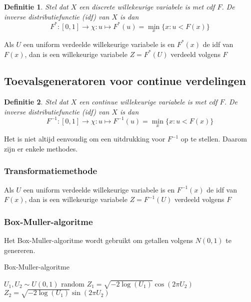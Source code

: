 \documentclass{article}
\newtheorem{mydef}{Definitie}
\begin{document}
	\begin{mydef}
		Stel dat $X$ een discrete willekeurige variabele is met cdf $F$. De inverse distributiefunctie (idf) van $X$ is dan
		$$
			F^*:[0,1] \rightarrow \chi : u \mapsto F^*(u) = \min_x\{x:u<F(x)\}
		$$
	\end{mydef}

	Als $U$ een uniform verdeelde willekeurige variabele is en $F^*(x)$ de idf van $F(x)$, dan is een willekeurige variabele $Z=F^*(U)$ verdeeld volgens $F$
	
	\subsection{Toevalsgeneratoren voor continue verdelingen}
	
	\begin{mydef}
		Stel dat $X$ een continue willekeurige variabele is met cdf $F$. De inverse distributiefunctie (idf) van $X$ is dan
		$$
		F^{-1}:[0,1] \rightarrow \chi : u \mapsto F^{-1}(u) = \min_x\{x:u<F(x)\}
		$$
	\end{mydef}

	Het is niet altijd eenvoudig om een uitdrukking voor $F^{-1}$ op te stellen. Daarom zijn er enkele methodes.
	
	\subsubsection{Transformatiemethode}
	
	Als $U$ een uniform verdeelde willekeurige variabele is en $F^{-1}(x)$ de idf van $F(x)$, dan is een willekeurige variabele $Z=F^{-1}(U)$ verdeeld volgens $F$
	
	\subsubsection{Box-Muller-algoritme}
	
	Het Box-Muller-algoritme wordt gebruikt om getallen volgens $N(0,1)$ te genereren.
	
	\begin{algorithm}[!ht]
		\caption{Box-Muller-algoritme}
		\begin{algorithmic}[1]
				\State $U_ 1, U_2 \sim U(0,1)$ random
				\State $Z_1 = \sqrt{-2 \log(U_1)} \cos(2 \pi U_2)$
				\State $Z_2 = \sqrt{-2 \log(U_1)} \sin(2 \pi U_2)$
			\EndProcedure
		\end{algorithmic}
	\end{algorithm}
	
\end{document}
